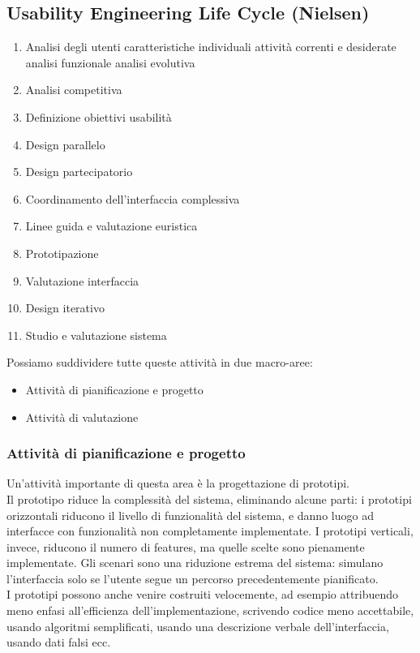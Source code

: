 \documentclass{article}
\begin{document}
\subsection{Usability Engineering Life Cycle (Nielsen)}
\begin{enumerate}
	\item Analisi degli utenti
	\subitem caratteristiche individuali
	\subitem attività correnti e desiderate
	\subitem analisi funzionale
	\subitem analisi evolutiva
	\item Analisi competitiva
	\item Definizione obiettivi usabilità
	\item Design parallelo
	\item Design partecipatorio
	\item Coordinamento dell'interfaccia complessiva
	\item Linee guida e valutazione euristica
	\item Prototipazione
	\item Valutazione interfaccia
	\item Design iterativo
	\item Studio e valutazione sistema
\end{enumerate}
Possiamo suddividere tutte queste attività in due macro-aree:
\begin{itemize}
	\item Attività di pianificazione e progetto
	\item Attività di valutazione
\end{itemize}
\subsubsection{Attività di pianificazione e progetto}
Un'attività importante di questa area è la progettazione di prototipi.\\
Il prototipo riduce la complessità del sistema, eliminando alcune parti: i prototipi orizzontali riducono il livello di funzionalità del sistema, e danno luogo ad interfacce con funzionalità non completamente implementate. I prototipi verticali, invece, riducono il numero di features, ma quelle scelte sono pienamente implementate.
Gli scenari sono una riduzione estrema del sistema: simulano l'interfaccia solo se l'utente segue un percorso precedentemente pianificato.\\
I prototipi possono anche venire costruiti velocemente, ad esempio attribuendo meno enfasi all'efficienza dell'implementazione, scrivendo codice meno accettabile, usando algoritmi semplificati, usando una descrizione verbale dell'interfaccia, usando dati falsi ecc.\\
\end{document}
